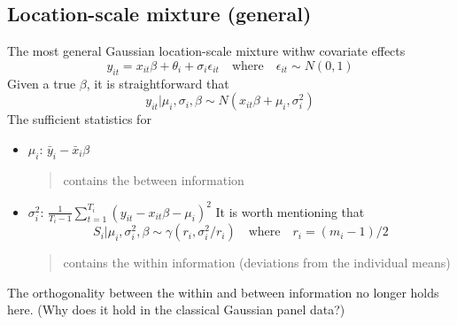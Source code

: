 \subsection{Location-scale mixture (general)}
The most general Gaussian location-scale mixture withw covariate effects
\begin{equation*}
    y_{it}=x_{it}\beta+\theta_i+\sigma_i\epsilon_{it} \quad \text{where} \quad \epsilon_{it}\sim N(0,1)
\end{equation*}
Given a true $\beta$, it is straightforward that \begin{equation*}
    y_{it}|\mu_i,\sigma_i,\beta \sim N(x_{it}\beta+\mu_i,\sigma_i^2)
\end{equation*}
The sufficient statistics for
\begin{itemize}
    \item $\mu_i$: $\bar{y}_i-\bar{x}_i\beta$
          \begin{quote}
              contains the between information
          \end{quote}
    \item $\sigma_i^2$: $\frac{1}{T_i-1}\sum_{t=1}^{T_i}(y_{it}-x_{it}\beta-\mu_i)^2$
          It is worth mentioning that \begin{equation*}
              S_i|\mu_i,\sigma_i^2,\beta \sim \gamma(r_i,\sigma_i^2/r_i) \quad \text{where} \quad r_i=(m_i-1)/2
          \end{equation*}
          \begin{quote}
              contains the within information (deviations from the individual means)
          \end{quote}
\end{itemize}
\begin{remark}
    The orthogonality between the within and between information no longer holds here. (Why does it hold in the classical Gaussian panel data?)
\end{remark}

